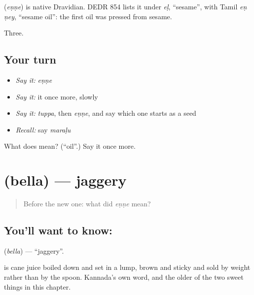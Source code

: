 \begin{cousinweb}
\textbf{} (\emph{eṇṇe}) is native Dravidian. DEDR 854 lists it under \emph{eḷ}, \textquotedblleft{}sesame\textquotedblright{}, with Tamil \emph{eṇ ṇey}, \textquotedblleft{}sesame oil\textquotedblright{}: the first oil was pressed from sesame.
\end{cousinweb}

\begin{grammarlens}[title={What you've built}]
Three.
\end{grammarlens}

\subsection*{Your turn}
\begin{itemize}
\raggedright
  \item \emph{Say it:} \emph{eṇṇe}
  \item \emph{Say it:} it once more, slowly
  \item \emph{Say it:} \emph{tuppa}, then \emph{eṇṇe}, and say which one starts as a seed
  \item \emph{Recall:} say \emph{maraḷu}
\end{itemize}

\begin{tcolorbox}[breakable,colback=teal!4,colframe=teal!35!black,title={Before you move on}]
What does  mean? (\textquotedblleft{}oil\textquotedblright{}.) Say it once more.
\end{tcolorbox}
\section[\texorpdfstring{\kn{ಬೆಲ್ಲ} (bella)}{ಬೆಲ್ಲ (bella)}]{ (bella) — jaggery}

\label{lesson:KA-C61-jaggery}



\begin{quote}
Before the new one: what did \emph{eṇṇe} mean?
\end{quote}

\subsection*{You'll want to know: }
\textbf{} (\emph{bella}) — \textquotedblleft{}jaggery\textquotedblright{}.

 is cane juice boiled down and set in a lump, brown and sticky and sold by weight rather than by the spoon. Kannada's own word, and the older of the two sweet things in this chapter.

